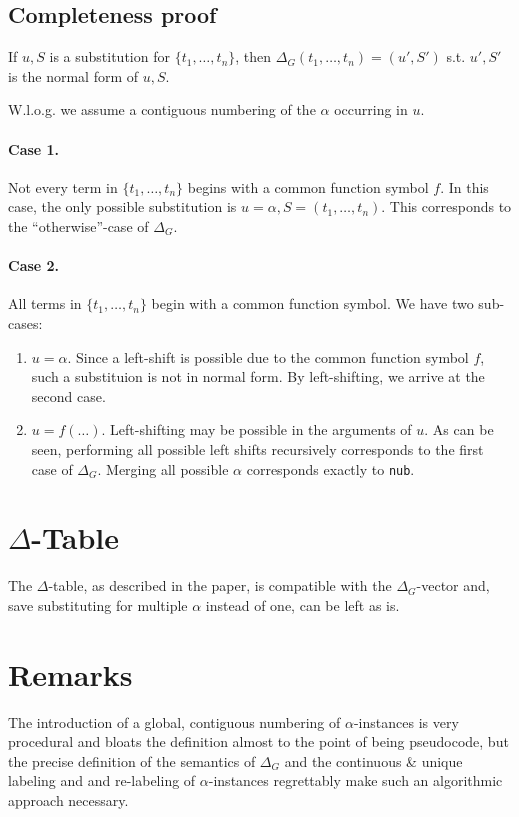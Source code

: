 \documentclass[a4paper, 11pt]{report}
\begin{document}
\subsection{Completeness proof}

If $u,S$ is a substitution for $\{t_1,\dots,t_n\}$, then $\Delta_G(t_1,\dots,t_n) = (u',S')$ s.t. $u',S'$ is the normal form of $u,S$.

W.l.o.g. we assume a contiguous numbering of the $\alpha$ occurring in $u$.

\paragraph{Case 1.} Not every term in $\{t_1,\dots,t_n\}$ begins with a common function symbol $f$. In this case, the only possible substitution is $u=\alpha, S=(t_1,\dots,t_n)$. This corresponds to the ``otherwise''-case of $\Delta_G$.

\paragraph{Case 2.} All terms in $\{t_1,\dots,t_n\}$ begin with a common function symbol. We have two sub-cases:
\begin{enumerate}
  \item $u=\alpha$. Since a left-shift is possible due to the common function symbol $f$, such a substituion is not in normal form. By left-shifting, we arrive at the second case.
  \item $u=f(\dots)$. Left-shifting may be possible in the arguments of $u$. As can be seen, performing all possible left shifts recursively corresponds to the first case of $\Delta_G$. Merging all possible $\alpha$ corresponds exactly to \texttt{nub}.
\end{enumerate}


\section{$\Delta$-Table}

The $\Delta$-table, as described in the paper, is compatible with the $\Delta_G$-vector and, save substituting for multiple $\alpha$ instead of one, can be left as is. 

\section{Remarks}

The introduction of a global, contiguous numbering of $\alpha$-instances is very procedural and bloats the definition almost to the point of being pseudocode, but the precise definition of the semantics of $\Delta_G$ and the continuous \& unique labeling and and re-labeling of $\alpha$-instances regrettably make such an algorithmic approach necessary.\\
\end{document}
